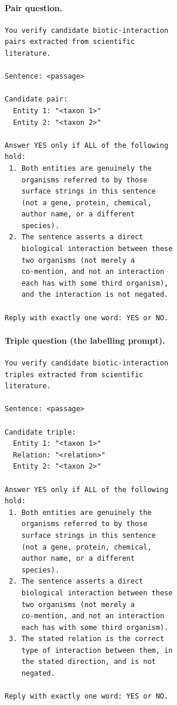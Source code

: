 \documentclass[11pt]{article}
\begin{document}
\paragraph{Pair question.}
\begin{footnotesize}
\begin{verbatim}
You verify candidate biotic-interaction
pairs extracted from scientific
literature.

Sentence: <passage>

Candidate pair:
  Entity 1: "<taxon 1>"
  Entity 2: "<taxon 2>"

Answer YES only if ALL of the following
hold:
 1. Both entities are genuinely the
    organisms referred to by those
    surface strings in this sentence
    (not a gene, protein, chemical,
    author name, or a different
    species).
 2. The sentence asserts a direct
    biological interaction between these
    two organisms (not merely a
    co-mention, and not an interaction
    each has with some third organism),
    and the interaction is not negated.

Reply with exactly one word: YES or NO.
\end{verbatim}
\end{footnotesize}

\paragraph{Triple question (the labelling prompt).}
\begin{footnotesize}
\begin{verbatim}
You verify candidate biotic-interaction
triples extracted from scientific
literature.

Sentence: <passage>

Candidate triple:
  Entity 1: "<taxon 1>"
  Relation: "<relation>"
  Entity 2: "<taxon 2>"

Answer YES only if ALL of the following
hold:
 1. Both entities are genuinely the
    organisms referred to by those
    surface strings in this sentence
    (not a gene, protein, chemical,
    author name, or a different
    species).
 2. The sentence asserts a direct
    biological interaction between these
    two organisms (not merely a
    co-mention, and not an interaction
    each has with some third organism).
 3. The stated relation is the correct
    type of interaction between them, in
    the stated direction, and is not
    negated.

Reply with exactly one word: YES or NO.
\end{verbatim}
\end{footnotesize}
\end{document}
